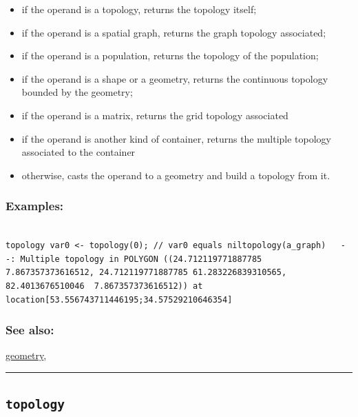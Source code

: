 \documentclass[]{book}
\providecommand{\tightlist}{%
  \setlength{\itemsep}{0pt}\setlength{\parskip}{0pt}}
\theoremstyle{definition}
\theoremstyle{definition}
\theoremstyle{definition}
\theoremstyle{remark}
\begin{document}
\begin{itemize}
\tightlist
\item
  if the operand is a topology, returns the topology itself;\\
\item
  if the operand is a spatial graph, returns the graph topology
  associated;\\
\item
  if the operand is a population, returns the topology of the
  population;\\
\item
  if the operand is a shape or a geometry, returns the continuous
  topology bounded by the geometry;\\
\item
  if the operand is a matrix, returns the grid topology associated\\
\item
  if the operand is another kind of container, returns the multiple
  topology associated to the container\\
\item
  otherwise, casts the operand to a geometry and build a topology from
  it.
\end{itemize}

\subsubsection{Examples:}\label{examples-363}

\begin{verbatim}
 
topology var0 <- topology(0); // var0 equals niltopology(a_graph)   --: Multiple topology in POLYGON ((24.712119771887785 7.867357373616512, 24.712119771887785 61.283226839310565, 82.4013676510046  7.867357373616512)) at location[53.556743711446195;34.57529210646354] 
\end{verbatim}

\subsubsection{See also:}\label{see-also-206}

\href{operators-d-to-h.html\#geometry}{geometry},

\begin{center}\rule{0.5\linewidth}{\linethickness}\end{center}

\subsection{\texorpdfstring{\texttt{topology}}{topology}}\label{topology-1}
\end{document}
